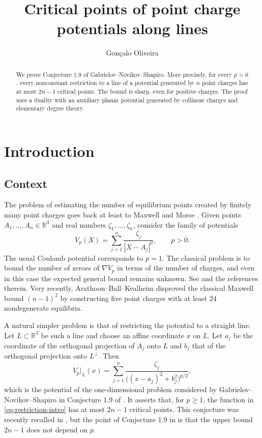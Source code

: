 \documentclass[leqno,11pt]{amsart}
\title{Critical points of point charge potentials along lines}
\author{Gon\c{c}alo Oliveira}
\date{}
\numberwithin{equation}{section}
\newcommand{\bbR}{\mathbb{R}}
\theoremstyle{definition}
\begin{document}
	\raggedbottom
	
	\begin{abstract}
		We prove Conjecture 1.9 of Gabrielov--Novikov--Shapiro. More precisely, for every $p>0$, every nonconstant restriction to a line of a potential generated by $n$ point charges has at most $2n-1$ critical points. The bound is sharp, even for positive charges. The proof uses a duality with an auxiliary planar potential generated by collinear charges and elementary degree theory.
	\end{abstract}
	
	\maketitle
	
	\section{Introduction}
	
	\subsection{Context}
	
	The problem of estimating the number of equilibrium points created by finitely many point charges goes back at least to Maxwell \cite{Maxwell} and Morse \cite{MorseCairns}. Given points $A_1,\ldots,A_n\in\bbR^3$ and real numbers $\zeta_1,\ldots,\zeta_n$, consider the family of potentials
	\begin{equation}\label{eq:potential-intro}
		V_p(X)=\sum_{j=1}^n \frac{\zeta_j}{|X-A_j|^p},\qquad p>0.
	\end{equation}
	The usual Coulomb potential corresponds to $p=1$. The classical problem is to bound the number of zeroes of $\nabla V_p$ in terms of the number of charges, and even in this case the expected general bound remains unknown. See \cite{GNS,EFO} and the references therein. Very recently, Arathoon--Ball--Kvalheim \cite{ABK} disproved the classical Maxwell bound $(n-1)^2$ by constructing five point charges with at least $24$ nondegenerate equilibria. 
	
	A natural simpler problem is that of restricting the potential to a straight line. Let $L\subset\bbR^3$ be such a line and choose an affine coordinate $x$ on $L$. Let $a_j$ be the coordinate of the orthogonal projection of $A_j$ onto $L$ and $b_j$ that of the orthogonal projection onto $L^\perp$. Then
	\begin{equation}\label{eq:restriction-intro}
		V_p|_L(x)=\sum_{j=1}^n \frac{\zeta_j}{\big((x-a_j)^2+b_j^2\big)^{p/2}},
	\end{equation}
	which is the potential of the one-dimensional problem considered by Gabrielov--Novikov--Shapiro in Conjecture 1.9 of \cite{GNS}. It asserts that, for $p\geq1$, the function in \eqref{eq:restriction-intro} has at most $2n-1$ critical points. This conjecture was recently recalled in \cite{EFO}, but the point of Conjecture 1.9 in \cite{GNS} is that the upper bound $2n-1$ does not depend on $p$.
	
\end{document}
